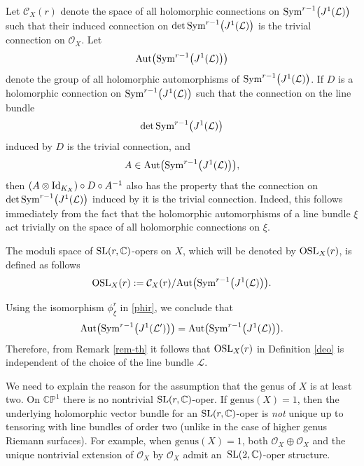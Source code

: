 \documentclass[pdftex]{sigma}
\numberwithin{equation}{section}
\begin{document}
Let ${\mathcal C}_X(r)$ denote the space of all holomorphic connections on ${\rm Sym}^{r-1}\bigl(J^1(\mathcal L)\bigr)$ such that their induced connection on $\det {\rm Sym}^{r-1}\bigl(J^1(\mathcal
L)\bigr)$ is the trivial connection on ${\mathcal O}_X$. Let
\[
\text{Aut}\bigl({\rm
Sym}^{r-1}\bigl(J^1(\mathcal L)\bigr)\bigr)\]
 denote the group of all holomorphic automorphisms of ${\rm
Sym}^{r-1}\bigl(J^1(\mathcal L)\bigr)$. If $D$ is a holomorphic connection on ${\rm
Sym}^{r-1}\bigl(J^1(\mathcal L)\bigr)$ such that the connection on the line bundle
\[
\det {\rm
Sym}^{r-1}\bigl(J^1(\mathcal L)\bigr)\]
 induced by $D$ is the trivial connection, and
\[
A \in \text{Aut}\bigl({\rm Sym}^{r-1}\bigl(J^1(\mathcal L)\bigr)\bigr),
\]
then %
$(A\otimes{\rm
Id}_{K_X})\circ D\circ A^{-1}$ also has the property that the connection on $\det {\rm
Sym}^{r-1}\bigl(J^1(\mathcal L)\bigr)$ induced by it is the trivial connection. Indeed, this follows immediately from
the fact that the holomorphic automorphisms of a line bundle $\xi$ act trivially on the space of all
holomorphic connections on $\xi$.

\begin{Definition}\label{deo}
The moduli space of ${\rm SL}(r, {\mathbb C})$-opers on $X$, which will be denoted by ${\rm OSL}_X(r)$, is defined as follows
\begin{equation}\label{f2}
{\rm OSL}_X(r) := {\mathcal C}_X(r)/\text{Aut}\bigl({\rm
Sym}^{r-1}\bigl(J^1(\mathcal L)\bigr)\bigr).
\end{equation}\end{Definition}

{}Using the isomorphism $\phi^r_\xi$ in \eqref{phir}, we conclude that
\[
\text{Aut}\bigl({\rm Sym}^{r-1}\bigl(J^1({\mathcal L}')\bigr)\bigr)
 = \text{Aut}\bigl({\rm Sym}^{r-1}\bigl(J^1(\mathcal L)\bigr)\bigr).\]
 Therefore, from Remark \ref{rem-th} it follows that
${\rm OSL}_X(r)$ in Definition \ref{deo} is independent of the choice of the line bundle $\mathcal L$.

\begin{Remark}
We need to explain the reason for the assumption that the genus of $X$ is at least two. On ${\mathbb C}{\mathbb P}^1$ there
is no nontrivial ${\rm SL}(r, {\mathbb C})$-oper. If $\text{genus}(X) = 1$, then the underlying holomorphic vector
bundle for an ${\rm SL}(r, {\mathbb C})$-oper is \textit{not} unique up to tensoring with line bundles of order two (unlike
in the case of higher genus Riemann surfaces). For example, when ${\text{genus}(X) = 1}$, both
${\mathcal O}_X\oplus {\mathcal O}_X$ and the unique nontrivial extension of ${\mathcal O}_X$ by ${\mathcal O}_X$ admit an~${\rm SL}(2, {\mathbb C})$-oper structure.
\end{Remark}
\end{document}
